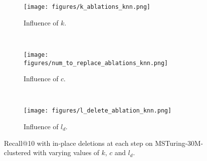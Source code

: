 \begin{figure*}[t]%
    \centering
     \begin{subfigure}[t]{0.32\textwidth}
        \texttt{[image: figures/k\_ablations\_knn.png]}
        \caption{Influence of $k$.}
        \label{fig:ablation_k_plot}
    \end{subfigure}
~
     \begin{subfigure}[t]{0.32\textwidth}
        \texttt{[image: figures/num\_to\_replace\_ablations\_knn.png]}
        \caption{Influence of $c$.}
        \label{fig:ablation_c_plot}
    \end{subfigure}
~
     \begin{subfigure}[t]{0.32\textwidth}
        \texttt{[image: figures/l\_delete\_ablation\_knn.png]}
        \caption{Influence of $l_{d}$.}
        \label{fig:ablation_k_plot}
    \end{subfigure}
        \vspace{-5pt}
    \caption{Recall@10 with in-place deletions at each step on MSTuring-30M-clustered
    with varying values of $k$, $c$ and $l_{d}$.}
\end{figure*}

